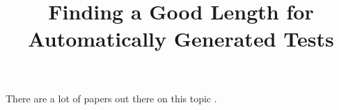 \documentclass{IEEEtran}
\title{Finding a Good Length for Automatically Generated Tests}
\author{}
\begin{document}
\maketitle



There are a lot of papers out there on this topic \cite{ASE08}.



\end{document}
